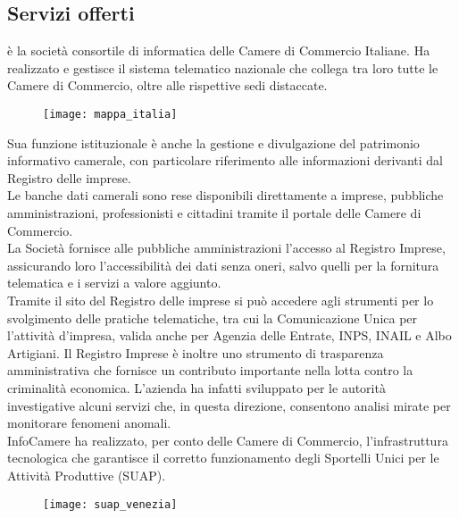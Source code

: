 	\subsection{Servizi offerti}
	\nomeAzienda è la società consortile di informatica delle Camere di Commercio Italiane. Ha realizzato e gestisce il sistema telematico nazionale che collega tra loro tutte le Camere di Commercio, oltre alle rispettive sedi distaccate. 
	
	\begin{figure}[htbp]
		\begin{center}
			\texttt{[image: mappa\_italia]}
		\end{center}
	\end{figure}
	
	Sua funzione istituzionale è anche la gestione e divulgazione del patrimonio informativo camerale, con particolare riferimento alle informazioni derivanti dal Registro delle imprese.\\
	Le banche dati camerali sono rese disponibili direttamente a imprese, pubbliche amministrazioni, professionisti e cittadini tramite il portale delle Camere di Commercio. \\
	La Società fornisce alle pubbliche amministrazioni l'accesso al Registro Imprese, assicurando loro l'accessibilità dei dati senza oneri, salvo quelli per la fornitura telematica e i servizi a valore aggiunto. \\
	Tramite il sito del Registro delle imprese si può accedere agli strumenti per lo svolgimento delle pratiche telematiche, tra cui la Comunicazione Unica per l'attività d'impresa, valida anche per Agenzia delle Entrate, INPS, INAIL e Albo Artigiani. Il Registro Imprese è inoltre uno strumento di trasparenza amministrativa che fornisce un contributo importante nella lotta contro la criminalità economica. L'azienda ha infatti sviluppato per le autorità investigative alcuni servizi che, in questa direzione, consentono analisi mirate per monitorare fenomeni anomali. \\
	InfoCamere ha realizzato, per conto delle Camere di Commercio, l'infrastruttura tecnologica che garantisce il corretto funzionamento degli Sportelli Unici per le Attività Produttive (SUAP).
	
	\begin{figure}[htbp]
		\begin{center}
			\texttt{[image: suap\_venezia]}
		\end{center}
	\end{figure}
	
